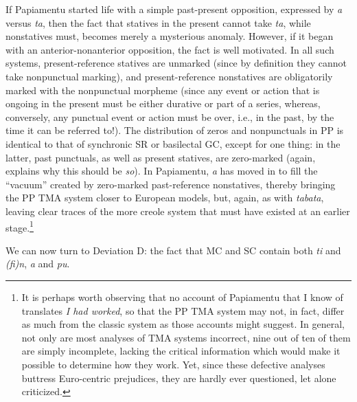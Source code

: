 \z
{}

\z

\z

\label{ex:2:102}\z

If Papiamentu started life with a simple past-present opposition,
expressed by \textit{a} versus \textit{ta}, then the fact that statives in the present cannot take \textit{ta}, while nonstatives must, becomes merely a mysterious anomaly. However, if it began with an anterior-nonanterior opposition, the fact is well motivated. In all such systems, present-reference statives are unmarked (since by definition they cannot take nonpunctual mark\-ing), and present-reference nonstatives are obligatorily marked with the nonpunctual morpheme (since any event or action that is ongoing in the present must be either durative or part of a series, whereas, con\-versely, any punctual event or action must be over, i.e., in the past, by the time it can be referred to!). The distribution of zeros and nonpunctuals in PP is identical to that of synchronic SR or basilectal GC, except for one thing: in the latter, past punctuals, as well as present statives, are zero-marked (again, \citet[Chapter 2]{Bickerton1975} explains why this should be \textit{so}). In Papiamentu, \textit{a} has moved in to fill the ``vacuum'' created by zero-marked past-reference nonstatives, thereby bringing the PP TMA system closer to European models, but, again, as with \textit{tabata}, leaving clear traces of the more creole system that must have existed at an earlier stage.\footnote{It is perhaps worth observing that no account of Papiamentu that I know of translates \textit{I had worked}, so that the PP TMA system may not, in fact, differ as much from the classic system as those ac\-counts might suggest. In general, not only are most analyses of TMA systems incorrect, nine out of ten of them are simply incomplete, lacking the critical information which would make it possible to deter\-mine how they work. Yet, since these defective analyses buttress Euro-centric prejudices, they are hardly ever questioned, let alone criticized.}

We can now turn to Deviation D: the fact that MC and SC contain both \textit{ti} and \textit{(fi)n}, \textit{a} and \textit{pu}.

